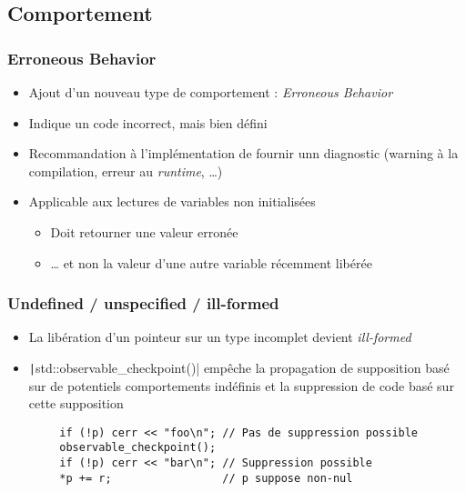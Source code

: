 \documentclass[C++.tex]{subfiles}
\begin{document}
\subsection*{Comportement}
\begin{frame}[fragile]
	\frametitle{Erroneous Behavior}
	\begin{itemize}
		\item Ajout d'un nouveau type de comportement : \textit{Erroneous Behavior}
		\item Indique un code incorrect, mais bien défini
		\item Recommandation à l'implémentation de fournir unn diagnostic (warning à la compilation, erreur au \textit{runtime}, \ldots{})
		\item Applicable aux lectures de variables non initialisées
		\begin{itemize}
			\item Doit retourner une valeur \og{}erronée\fg{}


			\item \ldots{} et non la valeur d'une autre variable récemment libérée
		\end{itemize}
	\end{itemize}

\end{frame}

\begin{frame}[fragile]
	\frametitle{Undefined / unspecified / ill-formed}
	\begin{itemize}
		\item La libération d'un pointeur sur un type incomplet devient \textit{ill-formed}


		\item \texttt|std::observable_checkpoint()| empêche la propagation de supposition basé sur de potentiels comportements indéfinis et la suppression de code basé sur cette supposition
	\end{itemize}

	\begin{verbatim}
		if (!p) cerr << "foo\n"; // Pas de suppression possible
		observable_checkpoint();
		if (!p) cerr << "bar\n"; // Suppression possible
		*p += r;                 // p suppose non-nul
	\end{verbatim}

\end{frame}
\end{document}
